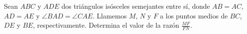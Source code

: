 Sean $ABC$ y $ADE$ dos triángulos isósceles semejantes entre sí, donde $AB = AC$, $AD = AE$ y $\angle BAD = \angle CAE$. Llamemos $M$, $N$ y $F$ a los puntos medios de $BC$, $DE$ y $BE$, respectivamente. Determina el valor de la razón $\frac{MF}{FN}$.